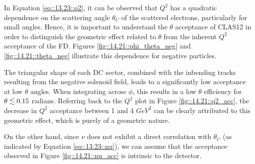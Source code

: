     In Equation \eqref{eq::13.23::q2}, it can be observed that $Q^2$ has a quadratic dependence on the scattering angle $\theta_C$ of the scattered electrons, particularly for small angles.
    Hence, it is important to understand the $\theta$ acceptance of CLAS12 in order to distinguish the geometric effect related to $\theta$ from the inherent $Q^2$ acceptance of the FD.
    Figures \ref{fig::14.21::phi_theta_neg} and \ref{fig::14.21::theta_neg} illustrate this dependence for negative particles.

    The triangular shape of each DC sector, combined with the inbending tracks resulting from the negative solenoid field, leads to a significantly low acceptance at low $\theta$ angles.
    When integrating across $\phi$, this results in a low $\theta$ efficiency for $\theta \lesssim 0.15$ radians.
    Referring back to the $Q^2$ plot in Figure \ref{fig::14.21::q2_acc}, the decrease in $Q^2$ acceptance between 1 and 4 $GeV^2$ can be clearly attributed to this geometric effect, which is purely of a geometric nature.

    On the other hand, since $\nu$ does not exhibit a direct correlation with $\theta_C$ (as indicated by Equation \eqref{eq::13.23::nu}), we can assume that the acceptance observed in Figure \ref{fig::14.21::nu_acc} is intrinsic to the detector.
